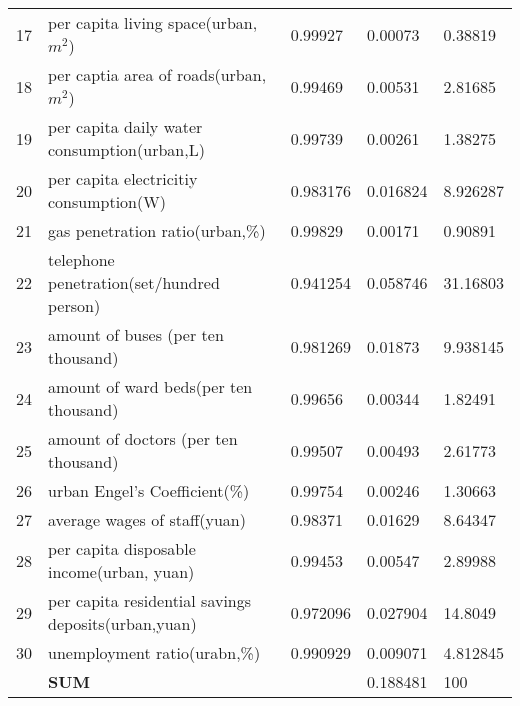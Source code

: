 \documentclass{mcmthesis}
\begin{document}
\begin{table}
\begin{tabular}{p{0.4cm}|p{9cm}|p{1.5cm}|p{1.5cm}|p{1.7cm}}
17		& per capita living space(urban,$m^2$)		& 0.99927		& 0.00073		& 0.38819 \\	
18		& per captia area of roads(urban,$m^2$)		& 0.99469		& 0.00531		& 2.81685 \\	
19		& per capita daily water consumption(urban,L)		& 0.99739		& 0.00261		& 1.38275 \\	
20		& per capita electricitiy consumption(W)		& 0.983176		& 0.016824		& 8.926287 \\	
21		& gas penetration ratio(urban,\%)		& 0.99829		& 0.00171		& 0.90891 \\	
22		& telephone penetration(set/hundred person)		& 0.941254		& 0.058746		& 31.16803 \\	
23		& amount of buses (per ten thousand)		& 0.981269		& 0.01873		& 9.938145 \\	
24		& amount of ward beds(per ten thousand)		& 0.99656		& 0.00344		& 1.82491 \\	
25		& amount of doctors (per ten thousand)		& 0.99507		& 0.00493		& 2.61773 \\	
26		& urban Engel's Coefficient(\%)		& 0.99754		& 0.00246		& 1.30663 \\	
27		& average wages of staff(yuan)		& 0.98371		& 0.01629		& 8.64347 \\	
28		& per capita disposable income(urban, yuan)		& 0.99453		& 0.00547		& 2.89988 \\	
29		& per capita residential savings deposits(urban,yuan)		& 0.972096		& 0.027904		& 14.8049 \\	
30		& unemployment ratio(urabn,\%)		& 0.990929		& 0.009071		& 4.812845 \\	
	& \bf SUM			& 		& 0.188481		& 100 \\	
\hline
\hline
\end{tabular}
\end{table}
\end{document}
